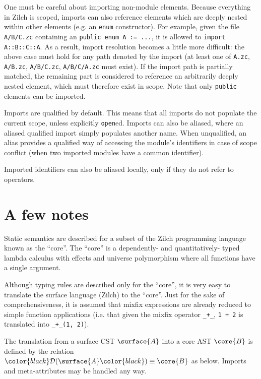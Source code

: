 One must be careful about importing non-module elements.
Because everything in Zilch is scoped, imports can also reference elements which are deeply nested within other elements (e.g. an \verb|enum| constructor).
For example, given the file \verb|A/B/C.zc| containing an \verb|public enum A := ...|, it is allowed to \verb|import A::B::C::A|.
As a result, import resolution becomes a little more difficult: the above case must hold for any path denoted by the import (at least one of \verb|A.zc|, \verb|A/B.zc|, \verb|A/B/C.zc|, \verb|A/B/C/A.zc| must exist).
If the import path is partially matched, the remaining part is considered to reference an arbitrarily deeply nested element, which must therefore exist in scope.
Note that only \verb|public| elements can be imported.

Imports are qualified by default.
This means that all imports do not populate the current scope, unless explicitly \verb|open|ed.
Imports can also be aliased, where an aliased qualified import simply populates another name.
When unqualified, an alias provides a qualified way of accessing the module's identifiers in case of scope conflict (when two imported modules have a common identifier).

Imported identifiers can also be aliased locally, only if they do not refer to operators.

\section{A few notes}\label{sec:zilch-staticsem-notes}

Static semantics are described for a subset of the Zilch programming language known as the ``core''.
The ``core'' is a dependently- and quantitatively- typed lambda calculus with effects and universe polymorphism where all functions have a single argument.

Although typing rules are described only for the ``core'', it is very easy to translate the surface language (Zilch) to the ``core''.
Just for the sake of comprehensiveness, it is assumed that mixfix expressions are already reduced to simple function applications (i.e. that given the mixfix operator \texttt{\_+\_}, \texttt{1 + 2} is translated into \texttt{\_+\_(1, 2)}).

\def\D#1{{\color{black}\mathcal{D}(}{\surface{#1}}{\color{black})}}
The translation from a surface CST $\surface{A}$ into a core AST $\core{B}$ is defined by the relation $\D{A} \equiv \core{B}$ as below.
Imports and meta-attributes may be handled any way.

